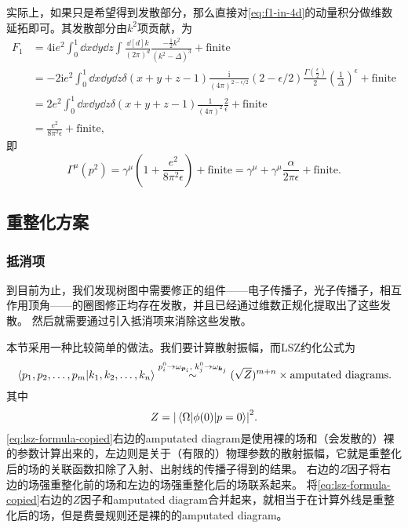 \documentclass[hyperref, UTF8, a4paper]{ctexart}
\newcommand*{\ii}{\mathrm{i}}
\begin{document}
实际上，如果只是希望得到发散部分，那么直接对\eqref{eq:f1-in-4d}的动量积分做维数延拓即可。其发散部分由$k^2$项贡献，为
\[
    \begin{aligned}
        F_1 &= 4 \ii e^2 \int_0^1 \dd{x} \dd{y} \dd{z} \int \frac{\dd[d]{k}}{(2\pi)^d} \frac{-\frac{1}{2} k^2}{(k^2 - \Delta)^3} + \text{finite} \\
        &= - 2 \ii e^2 \int_0^1 \dd{x} \dd{y} \dd{z} \delta(x + y + z - 1) \frac{\ii}{(4\pi)^{2 - \epsilon / 2}} (2 - \epsilon / 2) \frac{\Gamma\left(\frac{\epsilon}{2}\right)}{2} \left(\frac{1}{\Delta}\right)^{\epsilon} + \text{finite} \\
        &= 2 e^2 \int_0^1 \dd{x} \dd{y} \dd{z} \delta(x + y + z - 1) \frac{1}{(4\pi)^2} \frac{2}{\epsilon} + \text{finite} \\
        &= \frac{e^2}{8\pi^2 \epsilon} + \text{finite}, 
    \end{aligned}
\]
即
\begin{equation}
    \Gamma^\mu(p^2) = \gamma^\mu \left( 1 + \frac{e^2}{8\pi^2 \epsilon} \right) + \text{finite} = \gamma^\mu + \gamma^\mu \frac{\alpha}{2\pi \epsilon} + \text{finite}.
    \label{eq:vertex-one-loop-divergence}
\end{equation}

\subsection{重整化方案}

\subsubsection{抵消项}

到目前为止，我们发现树图中需要修正的组件——电子传播子，光子传播子，相互作用顶角——的圈图修正均存在发散，并且已经通过维数正规化提取出了这些发散。
然后就需要通过引入抵消项来消除这些发散。

本节采用一种比较简单的做法。我们要计算散射振幅，而LSZ约化公式为
\begin{equation}
    \braket*{p_1, p_2, \ldots, p_m}{k_1, k_2, \ldots, k_n} \stackrel{p_i^0 \to \omega_{\vb*{p}_i}, \; k_j^0 \to \omega_{\vb*{k}_j}}{\sim} (\sqrt{Z})^{m+n} \times \text{amputated diagrams}.
    \label{eq:lsz-formula-copied}
\end{equation}
其中
\begin{equation}
    Z = \abs{\mel*{\Omega}{\phi(0)}{p=0}}^2.
\end{equation}
\eqref{eq:lsz-formula-copied}右边的amputated diagram是使用裸的场和（会发散的）裸的参数计算出来的，左边则是关于（有限的）物理参数的散射振幅，它就是重整化后的场的关联函数扣除了入射、出射线的传播子得到的结果。
右边的$Z$因子将右边的场强重整化前的场和左边的场强重整化后的场联系起来。
将\eqref{eq:lsz-formula-copied}右边的$Z$因子和amputated diagram合并起来，就相当于在计算外线是重整化后的场，但是费曼规则还是裸的的amputated diagram。
\end{document}
